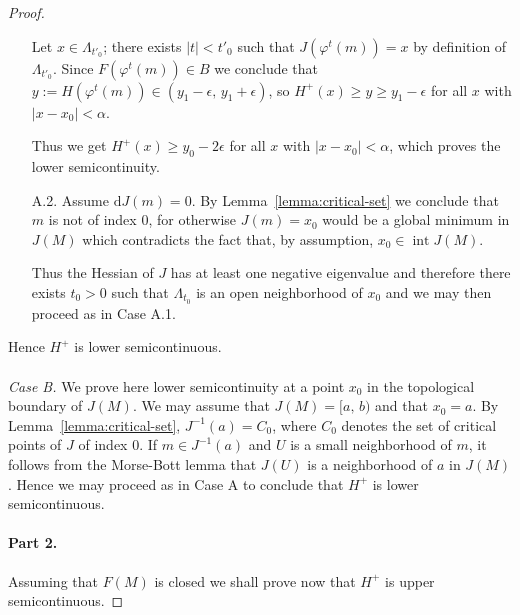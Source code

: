 \documentclass[11pt]{article}
\newcommand{\DD}{\mathrm{d}}
\renewcommand{\geq}{\geqslant}
\begin{document}
\begin{proof}
\begin{itemize}
Let $x\in \Lambda_{t'_0}$; there exists $|t|<t'_0$ such that
$J(\varphi^t(m))=x$ by definition of $\Lambda_{t'_0}$. Since
$F(\varphi^t(m)) \in B$ we conclude that $y:=H(\varphi^t(m)) \in
(y_1-\epsilon,\, y_1+\epsilon)$, so $H^+(x)\geq y \geq y_1-\epsilon$
for all $x$ with $|x-x_0|<\alpha$.

Thus we get $H^+(x)\geq y_0-2\epsilon$ for all $x$ with
$|x-x_0|<\alpha$, which proves the lower semicontinuity.

 
\item[A.2.]  Assume $\DD J(m)=0$. By Lemma~\ref{lemma:critical-set} we
  conclude that $m$ is not of index $0$, for otherwise $J(m)=x_0$
  would be a global minimum in $J(M)$ which contradicts the fact that,
  by assumption, $x_0 \in \operatorname{int}J(M)$.

  Thus the Hessian of $J$ has at least one negative eigenvalue and
  therefore there exists $t_0>0$ such that $\Lambda_{t_0}$ is an open
  neighborhood of $x_0$ and we may then proceed as in Case A.1.
\end{itemize}
Hence $H^+$ is lower semicontinuous.
\\
\\
\emph{Case B.} We prove here lower semicontinuity at a point
$x_0$ in the topological boundary of $J(M)$.  We may assume that
$J(M)=[a,\,b)$ and that $x_0=a$. By Lemma~\ref{lemma:critical-set},
$J^{-1}(a)=C_0$, where $C_0$ denotes the set of critical points of $J$
of index $0$. If $m \in J^{-1}(a)$ and $U$ is a small neighborhood of
$m$, it follows from the Morse-Bott lemma that $J(U)$ is a
neighborhood of $a$ in $J(M)$. Hence we may proceed as in Case A to
conclude that $H^+$ is lower semicontinuous.

\paragraph{Part 2.} Assuming that $F(M)$ is closed we shall prove now
that $H^+$ is upper semicontinuous.


\end{proof}
\end{document}
